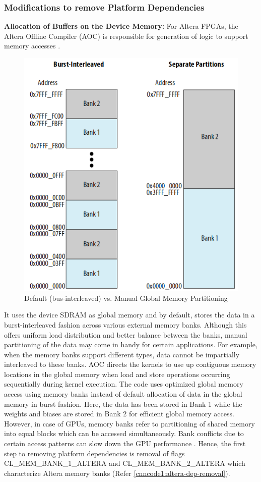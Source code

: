 \subsubsection{Modifications to remove Platform Dependencies}
\label{4_1_3_3}
\textbf{Allocation of Buffers on the Device Memory:}\newline
For Altera FPGAs, the Altera Offline Compiler (AOC) is responsible for generation of logic to support memory accesses \cite{alteraopencl}. 
\begin{figure}[h!]
 \centering
 \includegraphics[width=0.5\linewidth]{figures/global_mem_partitions.png}
 \caption{Default (bus-interleaved) vs. Manual Global Memory Partitioning
 \cite{alteraopencl}}
 \label{fig:global_mem_partitions}
\end{figure}
It uses the device SDRAM as global memory and by default, stores the data in a burst-interleaved fashion across various external memory banks. Although this offers uniform load distribution and better balance between the banks, manual partitioning of the data may come in handy for certain applications. For example, when the memory banks support different types, data cannot be impartially interleaved to these banks. AOC directs the kernels to use up contiguous memory locations in the global memory when load and store operations occurring sequentially during kernel execution. \newline \newline
The code \cite{mnist-altera-opencl} uses optimized global memory access using memory banks instead of default allocation of data in the global memory in burst fashion. 
Here, the data has been stored in Bank 1 while the weights and biases are stored in Bank 2 for efficient global memory access. However, in case of GPUs, memory banks refer to partitioning of shared memory into equal blocks which can be accessed simultaneously. Bank conflicts due to certain access patterns can slow down the GPU performance \cite{gpu_mem_bank}. Hence, the first step to removing platform dependencies is removal of flags CL\_MEM\_BANK\_1\_ALTERA and CL\_MEM\_BANK\_2\_ALTERA which characterize Altera memory banks (Refer \ref{cnncode1:altera-dep-removal}).\newline \newline
